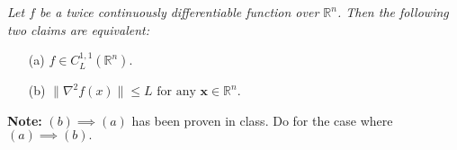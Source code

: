 \documentclass{ExerciseSheet}
\newif\ifsolutions
\begin{document}
\fi
\vskip 0.5cm
\begin{problem}
    
 \textit{Let $f$ be a twice continuously differentiable function over $\mathbb{R}^n $. Then the following two claims are equivalent:}

\begin{itemize}
    \item[(a)] $f \in C^{1,1}_L(\mathbb{R}^n)$.
    \item[(b)] $ \|\nabla^2 f(x)\| \leq L \text{ for any } \mathbf{x} \in \mathbb{R}^n$.
\end{itemize}
\textbf{Note:} $(b) \implies (a)$ has been proven in class. Do for the case where $(a) \implies (b).$
\end{problem}

\ifsolutions
\vskip 0.3cm
\begin{solution}

\textbf{(a) $\Rightarrow$ (b).} Suppose now that $f \in C^{1,1}_L$. Then by the fundamental theorem of calculus, for any $\mathbf{d} \in \mathbb{R}^n$ and $\alpha > 0$, we have
\[
\nabla f(x + \alpha \mathbf{d}) - \nabla f(x) = \int_0^{\alpha} \nabla^2 f(x + t \mathbf{d}) \mathbf{d} \, dt.
\]

Thus,
\[
\left\| \left( \int_0^{\alpha} \nabla^2 f(x + t \mathbf{d}) \, dt \right) \mathbf{d} \right\| = \| \nabla f(x + \alpha \mathbf{d}) - \nabla f(x) \| \leq \alpha L \|\mathbf{d}\|.
\]

Dividing by $\alpha$ and taking the limit $\alpha \to 0^+$, we obtain
\[
\left\| \nabla^2 f(x) \mathbf{d} \right\| \leq L \|\mathbf{d}\|,
\]
implying that $\|\nabla^2 f(x)\| \leq L$. \hfill $\square$

\end{solution}
\fi
\end{document}
